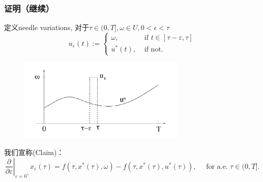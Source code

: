 \documentclass[UTF8, aspectratio=169, 9pt]{ctexbeamer}
\begin{document}
\begin{frame}
\frametitle{证明（继续） }
定义needle variations, 对于$\tau \in (0,T], \omega \in U, 0 < \epsilon < \tau$
$$
u_{\varepsilon}(t):=\left\{\begin{array}{cl}
\omega, & \text { if } t \in[\tau-\varepsilon, \tau] \\
u^{*}(t), & \text { if not. }
\end{array}\right.
$$
\begin{figure}
  \centering
  \includegraphics[width=8cm]{needle.png}
\end{figure}

我们宣称(Claim)：
$$
\left.\frac{\partial}{\partial \varepsilon}\right|_{\varepsilon=0^{+}} x_{\varepsilon}(\tau)=f\left(\tau, x^{*}(\tau), \omega\right)-f\left(\tau, x^{*}(\tau), u^{*}(\tau)\right), \quad \text { for a.e. } \tau \in(0, T].
$$
\end{frame}
\end{document}

